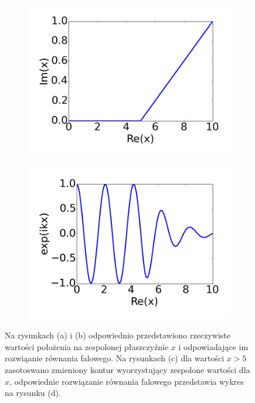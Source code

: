 \begin{figure}[tb]
	\begin{subfigure}{0.45\textwidth}
		\includegraphics[width=\textwidth]{images/pml/complex-x.png}
		\caption{}
		\label{fig:complex-contour}
	\end{subfigure}
	\begin{subfigure}{0.45\textwidth}
		\includegraphics[width=\textwidth]{images/pml/complex-x-wave.png}
		\caption{}
		\label{fig:absorbing-region}
	\end{subfigure}

	\caption{Na rysunkach (a) i (b) odpowiednio przedstawiono rzeczywiste wartości położenia na zespolonej płaszczyźnie $x$ i odpowiadające im rozwiąanie równania falowego. Na rysunkach (c) dla wartości $x>5$ zasotoswano zmieniony kontur wyorzystujący zespolone wartości dla $x$, odpowiednie rozwiązanie równania falowego przedstawia wykres na rysunku (d).}
	\label{fig:var-transform}
\end{figure}


